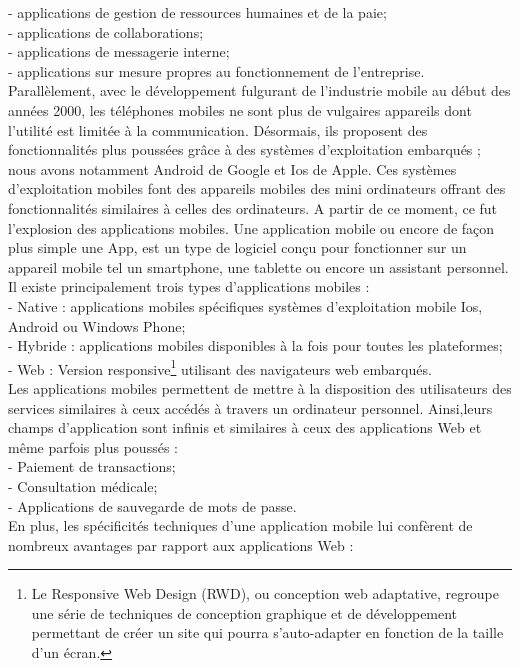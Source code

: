 - applications de gestion de ressources humaines et de la paie;\\
- applications de collaborations;\\
- applications de messagerie interne;\\
- applications sur mesure propres au fonctionnement de l’entreprise.\\
Parallèlement, avec le développement fulgurant de l'industrie mobile au début des années 2000, les téléphones mobiles ne sont plus de vulgaires appareils dont l'utilité est limitée à la communication. Désormais, ils proposent des fonctionnalités plus poussées grâce à des systèmes d'exploitation embarqués ; nous avons notamment Android de Google et Ios de Apple. Ces systèmes d'exploitation mobiles font des appareils mobiles des mini ordinateurs offrant des fonctionnalités similaires à celles des ordinateurs. A partir de ce moment, ce fut l'explosion des applications mobiles. Une application mobile ou encore de façon plus simple une App, est un type de logiciel conçu pour fonctionner sur un appareil mobile tel un smartphone, une tablette ou encore un assistant personnel. \\
Il existe principalement trois types d'applications mobiles :\\
- Native : applications mobiles spécifiques systèmes d'exploitation mobile Ios, Android ou Windows Phone;\\
- Hybride : applications mobiles disponibles à la fois pour toutes les plateformes;\\
- Web : Version responsive\footnote{Le Responsive Web Design (RWD), ou conception web adaptative, regroupe une série de techniques de conception graphique et de développement permettant de créer un site qui pourra s'auto-adapter en fonction de la taille d'un écran.} utilisant des navigateurs web embarqués.\\
Les applications mobiles permettent de mettre à la disposition des utilisateurs des services similaires à ceux accédés à travers un ordinateur personnel. Ainsi,leurs champs d'application sont infinis et similaires à ceux des applications Web et même parfois plus poussés :\\
- Paiement de transactions;\\
- Consultation médicale;\\
- Applications de sauvegarde de mots de passe.\\
En plus, les spécificités techniques d’une application mobile lui confèrent de nombreux avantages par rapport aux applications Web :\\
